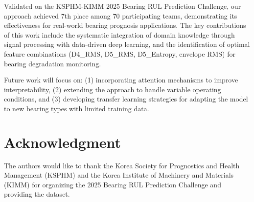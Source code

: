 \documentclass[conference,twocolumn]{IEEEtran}
\begin{document}
Validated on the KSPHM-KIMM 2025 Bearing RUL Prediction Challenge, our approach achieved 7th place among 70 participating teams, demonstrating its effectiveness for real-world bearing prognosis applications. The key contributions of this work include the systematic integration of domain knowledge through signal processing with data-driven deep learning, and the identification of optimal feature combinations (D4\_RMS, D5\_RMS, D5\_Entropy, envelope RMS) for bearing degradation monitoring.

Future work will focus on: (1) incorporating attention mechanisms to improve interpretability, (2) extending the approach to handle variable operating conditions, and (3) developing transfer learning strategies for adapting the model to new bearing types with limited training data.

\section*{Acknowledgment}

The authors would like to thank the Korea Society for Prognostics and Health Management (KSPHM) and the Korea Institute of Machinery and Materials (KIMM) for organizing the 2025 Bearing RUL Prediction Challenge and providing the dataset.



\end{document}

